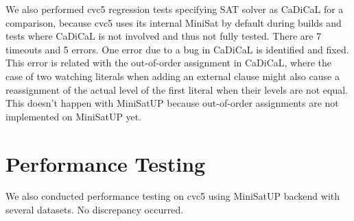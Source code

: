 We also performed cvc5 regression tests specifying SAT solver as CaDiCaL for a comparison, because cvc5 uses its internal MiniSat by default during builds and tests where CaDiCaL is not involved and thus not fully tested. There are 7 timeouts and 5 errors. One error due to a bug in CaDiCaL is identified and fixed. This error is related with the out-of-order assignment in CaDiCaL, where the  case of two watching literals when adding an external clause might also cause a reassignment of the actual level of the first literal when their levels are not equal. This doesn't happen with MiniSatUP because out-of-order assignments are not implemented on MiniSatUP yet.



\section{Performance Testing}

We also conducted performance testing on cvc5 using MiniSatUP backend with several datasets. No discrepancy occurred.

